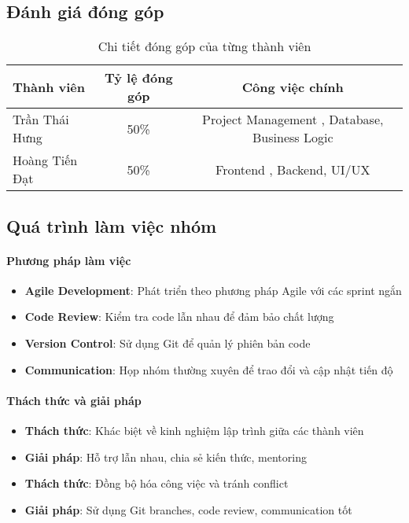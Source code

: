 \documentclass[12pt,a4paper]{article}
\begin{document}
 \subsection{Đánh giá đóng góp}

 \begin{table}[H]
 \centering
 \caption{Chi tiết đóng góp của từng thành viên}
 \label{tab:contribution_details}
 \begin{tabular}{|l|c|c|}
 \hline
 \textbf{Thành viên} & \textbf{Tỷ lệ đóng góp} & \textbf{Công việc chính} \\
 \hline
 Trần Thái Hưng & 50\% & Project Management , Database, Business Logic \\
 \hline
 Hoàng Tiến Đạt & 50\% & Frontend , Backend, UI/UX\\
 \hline
 \end{tabular}
 \end{table}

 \subsection{Quá trình làm việc nhóm}

 \paragraph{Phương pháp làm việc}
 \begin{itemize}
     \item \textbf{Agile Development}: Phát triển theo phương pháp Agile với các sprint ngắn
     \item \textbf{Code Review}: Kiểm tra code lẫn nhau để đảm bảo chất lượng
     \item \textbf{Version Control}: Sử dụng Git để quản lý phiên bản code
     \item \textbf{Communication}: Họp nhóm thường xuyên để trao đổi và cập nhật tiến độ
 \end{itemize}

 \paragraph{Thách thức và giải pháp}
 \begin{itemize}
     \item \textbf{Thách thức}: Khác biệt về kinh nghiệm lập trình giữa các thành viên
     \item \textbf{Giải pháp}: Hỗ trợ lẫn nhau, chia sẻ kiến thức, mentoring
     \item \textbf{Thách thức}: Đồng bộ hóa công việc và tránh conflict
     \item \textbf{Giải pháp}: Sử dụng Git branches, code review, communication tốt
 \end{itemize}
\end{document}
